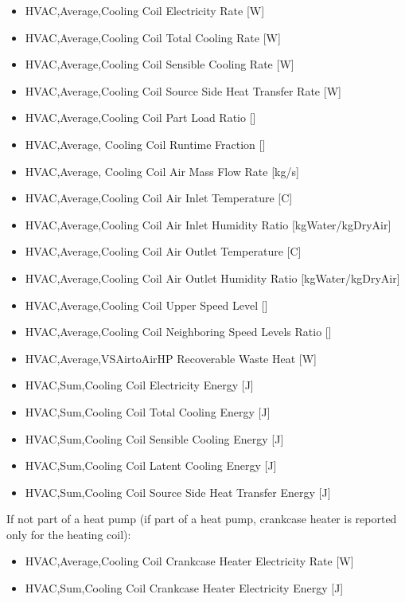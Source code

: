 \begin{itemize}
\item
  HVAC,Average,Cooling Coil Electricity Rate {[}W{]}
\item
  HVAC,Average,Cooling Coil Total Cooling Rate {[}W{]}
\item
  HVAC,Average,Cooling Coil Sensible Cooling Rate {[}W{]}
\item
  HVAC,Average,Cooling Coil Source Side Heat Transfer Rate {[}W{]}
\item
  HVAC,Average,Cooling Coil Part Load Ratio {[]}
\item
  HVAC,Average, Cooling Coil Runtime Fraction {[]}
\item
  HVAC,Average, Cooling Coil Air Mass Flow Rate {[}kg/s{]}
\item
  HVAC,Average,Cooling Coil Air Inlet Temperature {[}C{]}
\item
  HVAC,Average,Cooling Coil Air Inlet Humidity Ratio {[}kgWater/kgDryAir{]}
\item
  HVAC,Average,Cooling Coil Air Outlet Temperature {[}C{]}
\item
  HVAC,Average,Cooling Coil Air Outlet Humidity Ratio {[}kgWater/kgDryAir{]}
\item
  HVAC,Average,Cooling Coil Upper Speed Level {[]}
\item
  HVAC,Average,Cooling Coil Neighboring Speed Levels Ratio {[]}
\item
  HVAC,Average,VSAirtoAirHP Recoverable Waste Heat {[}W{]}
\item
  HVAC,Sum,Cooling Coil Electricity Energy {[}J{]}
\item
  HVAC,Sum,Cooling Coil Total Cooling Energy {[}J{]}
\item
  HVAC,Sum,Cooling Coil Sensible Cooling Energy {[}J{]}
\item
  HVAC,Sum,Cooling Coil Latent Cooling Energy {[}J{]}
\item
  HVAC,Sum,Cooling Coil Source Side Heat Transfer Energy {[}J{]}
\end{itemize}

If not part of a heat pump (if part of a heat pump, crankcase heater is reported only for the heating coil):

\begin{itemize}
\item
  HVAC,Average,Cooling Coil Crankcase Heater Electricity Rate {[}W{]}
\item
  HVAC,Sum,Cooling Coil Crankcase Heater Electricity Energy {[}J{]}
\end{itemize}

